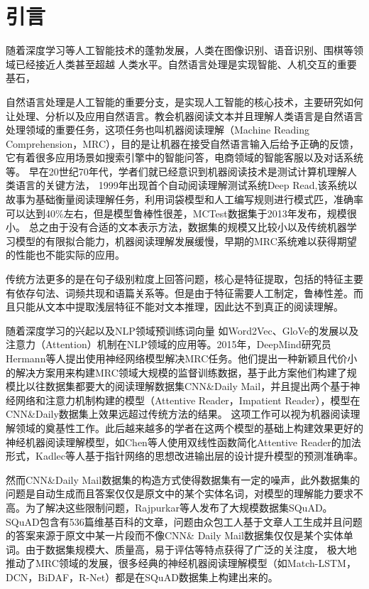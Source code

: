 \section{引言}

随着深度学习等人工智能技术的蓬勃发展，人类在图像识别、语音识别、围棋等领域已经接近人类甚至超越
人类水平。自然语言处理是实现智能、人机交互的重要基石，

自然语言处理是人工智能的重要分支，是实现人工智能的核心技术，主要研究如何让处理、分析以及应用自然语言。教会机器阅读文本并且理解人类语言是自然语言处理领域的重要任务，这项任务也叫机器阅读理解（Machine Reading Comprehension，MRC），目的是让机器在接受自然语言输入后给予正确的反馈，它有着很多应用场景如搜索引擎中的智能问答，电商领域的智能客服以及对话系统等。
早在20世纪70年代，学者们就已经意识到机器阅读技术是测试计算机理解人类语言的关键方法，
1999年出现首个自动阅读理解测试系统Deep Read,该系统以故事为基础衡量阅读理解任务，利用词袋模型和人工编写规则进行模式匹，准确率可以达到40\%左右，但是模型鲁棒性很差，MCTest数据集于2013年发布，规模很小。
总之由于没有合适的文本表示方法，数据集的规模又比较小以及传统机器学习模型的有限拟合能力，机器阅读理解发展缓慢，早期的MRC系统难以获得期望的性能也不能实际的应用。

传统方法更多的是在句子级别粒度上回答问题，核心是特征提取，包括的特征主要有依存句法、词频共现和语篇关系等。但是由于特征需要人工制定，鲁棒性差。而且只能从文本中提取浅层特征不能对文本推理，因此达不到真正的阅读理解。

随着深度学习的兴起以及NLP领域预训练词向量
如Word2Vec、GloVe的发展以及注意力（Attention）机制在NLP领域的应用等。2015年，DeepMind研究员Hermann等人提出使用神经网络模型解决MRC任务。他们提出一种新颖且代价小的解决方案用来构建MRC领域大规模的监督训练数据，基于此方案他们构建了规模比以往数据集都要大的阅读理解数据集CNN\&Daily Mail，并且提出两个基于神经网络和注意力机制构建的模型（Attentive Reader，Impatient Reader），模型在CNN\&Daily数据集上效果远超过传统方法的结果。
这项工作可以视为机器阅读理解领域的奠基性工作。此后越来越多的学者在这两个模型的基础上构建效果更好的神经机器阅读理解模型，如Chen等人使用双线性函数简化Attentive Reader的加法形式，Kadlec等人基于指针网络\cite{Ptr}的思想改进输出层的设计提升模型的预测准确率。

然而CNN\&Daily Mail数据集的构造方式使得数据集有一定的噪声，此外数据集的问题是自动生成而且答案仅仅是原文中的某个实体名词，对模型的理解能力要求不高。为了解决这些限制问题，Rajpurkar等人\cite{SQuAD1}发布了大规模数据集SQuAD。SQuAD包含有536篇维基百科的文章，问题由众包工人基于文章人工生成并且问题的答案来源于原文中某一片段而不像CNN\& Daily Mail数据集仅仅是某个实体单词。由于数据集规模大、质量高，易于评估等特点获得了广泛的关注度，
极大地推动了MRC领域的发展，很多经典的神经机器阅读理解模型（如Match-LSTM，DCN，BiDAF，R-Net）都是在SQuAD数据集上构建出来的。


